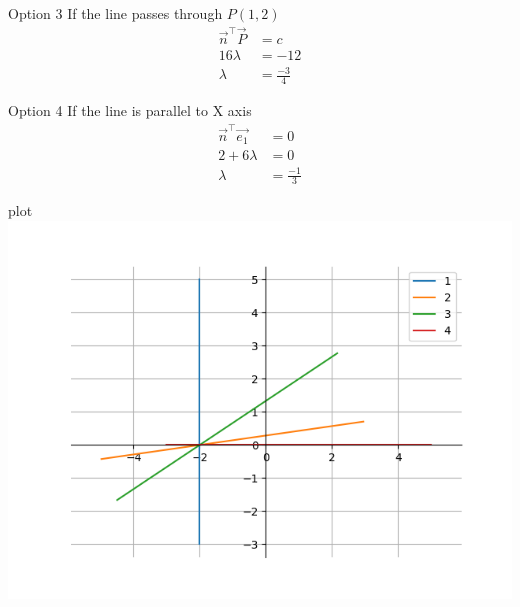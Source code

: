 \documentclass{beamer}
\begin{document}
\begin{frame}{Option 3}
If the line passes through $P(1,2)$
\begin{align}
  \vec{n}^\top \vec{P} &= c \\
  16\lambda &= -12 \\
  \lambda &= \frac{-3}{4}
\end{align}
\end{frame}
\begin{frame}{Option 4}
If the line is parallel to X axis
\begin{align}
\vec{n}^\top \vec{e_1} &=0 \\
2+6\lambda &= 0 \\
\lambda &= \frac{-1}{3}
\end{align}
\end{frame}
\begin{frame}{plot}
\centering
    \includegraphics[width=\columnwidth, height=0.8\textheight, keepaspectratio]{../figs/fig.png}     
\end{frame}
\end{document}
